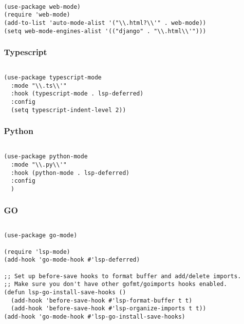 \documentclass[11pt]{article}
\begin{document}
\begin{verbatim}

(use-package web-mode)
(require 'web-mode)
(add-to-list 'auto-mode-alist '("\\.html?\\'" . web-mode))
(setq web-mode-engines-alist '(("django" . "\\.html\\'")))

\end{verbatim}

\subsubsection{Typescript}
\label{sec:org0d79cd3}

\begin{verbatim}

(use-package typescript-mode
  :mode "\\.ts\\'"
  :hook (typescript-mode . lsp-deferred)
  :config
  (setq typescript-indent-level 2))

\end{verbatim}

\subsubsection{Python}
\label{sec:org8018ed5}

\begin{verbatim}

(use-package python-mode
  :mode "\\.py\\'"
  :hook (python-mode . lsp-deferred)
  :config
  )

\end{verbatim}

\subsubsection{GO}
\label{sec:org95bb735}

\begin{verbatim}

(use-package go-mode)

(require 'lsp-mode)
(add-hook 'go-mode-hook #'lsp-deferred)

;; Set up before-save hooks to format buffer and add/delete imports.
;; Make sure you don't have other gofmt/goimports hooks enabled.
(defun lsp-go-install-save-hooks ()
  (add-hook 'before-save-hook #'lsp-format-buffer t t)
  (add-hook 'before-save-hook #'lsp-organize-imports t t))
(add-hook 'go-mode-hook #'lsp-go-install-save-hooks)

\end{verbatim}
\end{document}
